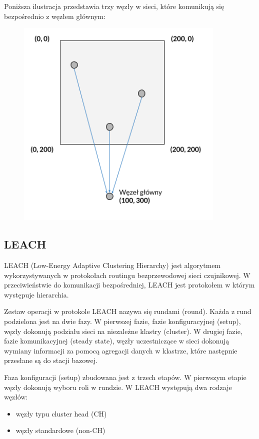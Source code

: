 \documentclass[a4paper,12pt,twoside,openany]{report}
\begin{document}
Poniższa ilustracja przedstawia trzy węzły w sieci, które komunikują się bezpośrednio z węzłem głównym:

\begin{figure}[H]
 \centering
 \includegraphics[width=10cm]{images/komunikacja_bezposrednia.png}
\end{figure}

\subsection{LEACH}

LEACH (Low-Energy Adaptive Clustering Hierarchy) jest algorytmem wykorzystywanych w protokołach routingu bezprzewodowej sieci czujnikowej.
W przeciwieństwie do komunikacji bezpośredniej, LEACH jest protokołem w którym występuje hierarchia. 

Zestaw operacji w protokole LEACH nazywa się rundami (round). Każda z rund podzielona jest na dwie fazy.
W pierwszej fazie, fazie konfiguracyjnej (setup), węzły dokonują podziału sieci na niezależne klastry (cluster).
W drugiej fazie, fazie komunikacyjnej (steady state), węzły uczestniczące w sieci dokonują wymiany informacji za pomocą agregacji danych w klastrze, które następnie
przesłane są do stacji bazowej.

Faza konfiguracji (setup) zbudowana jest z trzech etapów.
W pierwszym etapie węzły dokonują wyboru roli w rundzie. W LEACH występują dwa rodzaje węzłów:

\begin{itemize}
 \item węzły typu cluster head (CH)
 \item węzły standardowe (non-CH)
\end{itemize}
\end{document}
